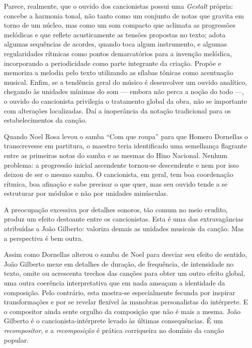 Parece, realmente, que o ouvido dos cancionistas possui uma \textit{Gestalt}
própria: concebe a harmonia tonal, não tanto como um conjunto de notas
que gravita em torno de um núcleo, mas como um som compacto que aclimata
as progressões melódicas e que reflete acusticamente as tensões
propostas no texto; adota algumas sequências de acordes, quando toca
algum instrumento, e algumas regularidades rítmicas como pontos
demarcatórios para a invenção melódica, incorporando a periodicidade
como parte integrante da criação. Propõe e memoriza a melodia pelo texto
utilizando as sílabas tônicas como acentuação musical. Enfim, se a
tendência geral do músico é desenvolver um ouvido analítico, chegando às
unidades mínimas do som --- embora não perca a noção do todo ---, o ouvido do
cancionista privilegia o tratamento global da obra, não se importante
com alterações localizadas. Daí a inoperância da notação tradicional
para os estabelecimentos da canção.

Quando Noel Rosa levou o samba ``Com que roupa'' para que Homero Dornellas o
transcrevesse em partitura, o maestro teria identificado uma semelhança
flagrante entre as primeiras notas do samba e as mesmas do Hino
Nacional. Nenhum problema: a progressão inicial ascendente tornou-se
descendente e nem por isso deixou de ser o mesmo samba. O cancionista,
em geral, tem boa coordenação rítmica, boa afinação e sabe precisar o
que quer, mas seu ouvido tende a se estruturar por módulos e não por
unidades minúsculas.

A preocupação excessiva por detalhes sonoros, tão comum no meio erudito,
produz um efeito destoante entre os cancionistas. Esta é uma das
extravagâncias atribuídas a João Gilberto: valoriza demais as unidades
musicais da canção. Mas a perspectiva é bem outra.

Assim como Dornellas alterou o samba de Noel para desviar seu efeito de
sentido, João Gilberto mexe em detalhes de duração, de frequência, de
intensidade no texto, omite ou acrescenta trechos das canções
para obter um outro efeito global, uma outra coerência interpretativa
que em nada ameaçam a identidade da composição. Pelo contrário, esta
mostra-se especialmente fecunda por inspirar transformações e por se
revelar flexível às manobras personalistas do intérprete. E o compositor
ainda sente orgulho da composição que não é mais a mesma. João Gilberto
é o cancionista-intérprete levado às últimas consequências. É um
\textit{recompositor}, e a \textit{recomposição} é prática corriqueira no domínio da
canção popular.

